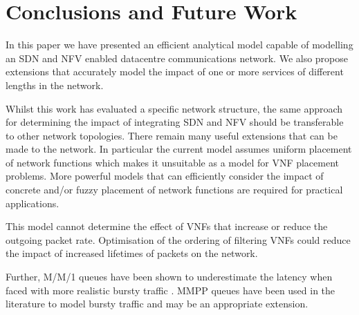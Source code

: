 
\section{Conclusions and Future Work}
\label{sec:conclusions}
In this paper we have presented an efficient analytical model capable of modelling an SDN and NFV enabled datacentre communications network. We also propose extensions that accurately model the impact of one or more services of different lengths in the network.

Whilst this work has evaluated a specific network structure, the same approach for determining the impact of integrating SDN and NFV should be transferable to other network topologies. There remain many useful extensions that can be made to the network. In particular the current model assumes uniform placement of network functions which makes it unsuitable as a model for VNF placement problems. More powerful models that can efficiently consider the impact of concrete and/or fuzzy placement of network functions are required for practical applications.

This model cannot determine the effect of VNFs that increase or reduce the outgoing packet rate. Optimisation of the ordering of filtering VNFs could reduce the impact of increased lifetimes of packets on the network.

Further, M/M/1 queues have been shown to underestimate the latency when faced with more realistic bursty traffic \cite{WuMLJ12}. MMPP queues have been used in the literature to model bursty traffic \cite{MiaoMWWH16, WuMLJ12} and may be an appropriate extension.